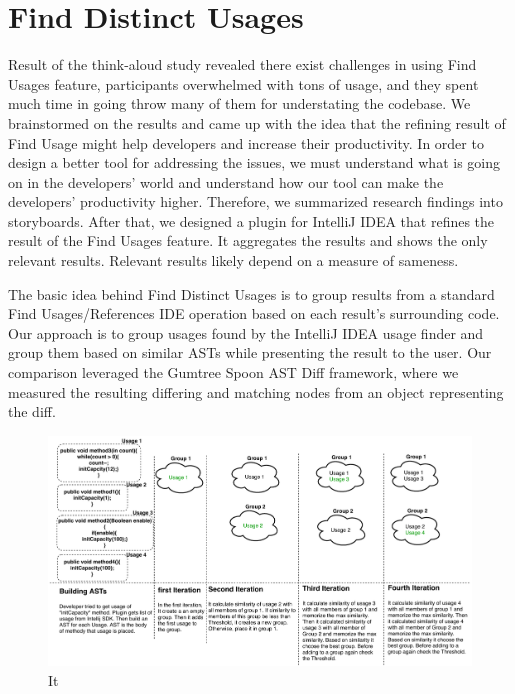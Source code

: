 \documentclass[conference]{IEEEtran}
\begin{document}
\section{Find Distinct Usages}
Result of the think-aloud study revealed there exist challenges in using Find Usages feature, participants overwhelmed with tons of usage, and they spent much time in going throw many of them for understating the codebase. We brainstormed on the results and came up with the idea that the refining result of Find Usage might help developers and increase their productivity. In order to design a better tool for addressing the issues, we must understand what is going on in the developers' world and understand how our tool can make the developers' productivity higher. Therefore, we summarized research findings into storyboards. After that, we designed a plugin for IntelliJ IDEA that refines the result of the Find Usages feature. It aggregates the results and shows the only relevant results. Relevant results likely depend on a measure of sameness.\par
The basic idea behind Find Distinct Usages is to group results from a standard Find Usages/References IDE operation based on each result's surrounding code. Our approach is to group usages found by the IntelliJ IDEA usage finder and group them based on similar ASTs while presenting the result to the user. Our comparison leveraged the Gumtree Spoon AST Diff framework, where we measured the resulting differing and matching nodes from an object representing the diff. \par


\begin{figure}
    \centering
    \includegraphics [width=\textwidth,keepaspectratio,clip]{figures/generalView}
    \caption{It }
\label{fig:general}
\end{figure}
\end{document}

